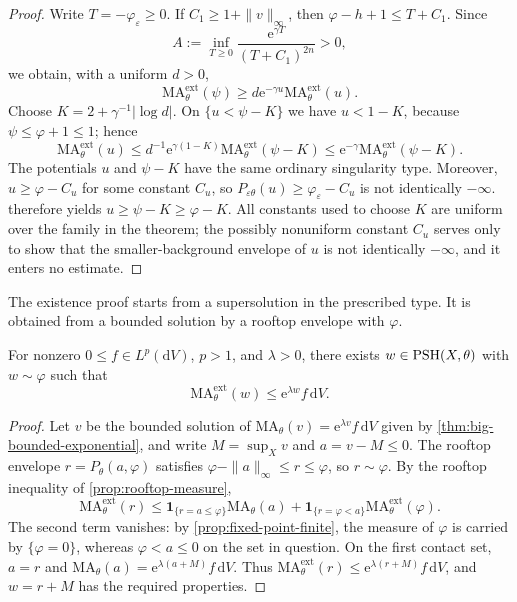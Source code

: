 \begin{proof}
Write $T=-\varphi_\varepsilon\geq0$. If $C_1\geq1+\|v\|_\infty$, then $\varphi-h+1\leq T+C_1$. Since
\[
 A:=\inf_{T\geq0}\frac{\mathrm{e}^{\gamma T}}{(T+C_1)^{2n}}>0,
\]
we obtain, with a uniform $d>0$,
\[
 \mathrm{MA}^{\mathrm{ext}}_\theta(\psi)
 \geq d \mathrm{e}^{-\gamma u}\mathrm{MA}^{\mathrm{ext}}_\theta(u).
\]
Choose $K=2+\gamma^{-1}|\log d|$. On $\{u<\psi-K\}$ we have $u<1-K$, because $\psi\leq\varphi+1\leq1$; hence
\[
 \mathrm{MA}^{\mathrm{ext}}_\theta(u)
 \leq d^{-1}\mathrm{e}^{\gamma(1-K)}
            \mathrm{MA}^{\mathrm{ext}}_\theta(\psi-K)
 \leq \mathrm{e}^{-\gamma}\mathrm{MA}^{\mathrm{ext}}_\theta(\psi-K).
\]
The potentials $u$ and $\psi-K$ have the same ordinary singularity type. Moreover, $u\geq\varphi-C_u$ for some constant $C_u$, so $P_{\varepsilon\theta}(u)\geq\varphi_\varepsilon-C_u$ is not identically $-\infty$.  therefore yields $u\geq\psi-K\geq\varphi-K$. All constants used to choose $K$ are uniform over the family in the theorem; the possibly nonuniform constant $C_u$ serves only to show that the smaller-background envelope of $u$ is not identically $-\infty$, and it enters no estimate.
\end{proof}

The existence proof starts from a supersolution in the prescribed type. It is obtained from a bounded solution by a rooftop envelope with $\varphi$.

\begin{lemma}\label{lem:relative-lp-supersolution}
For nonzero $0\leq f\in L^p(\mathrm{d}V)$, $p>1$, and $\lambda>0$, there exists $w\in\mathrm{PSH}(X,\theta)$ with $w\sim\varphi$ such that
\[
 \mathrm{MA}^{\mathrm{ext}}_\theta(w)\leq \mathrm{e}^{\lambda w}f\,\mathrm{d}V.
\]
\end{lemma}
\begin{proof}
Let $v$ be the bounded solution of $\mathrm{MA}_\theta(v)=\mathrm{e}^{\lambda v}f\,\mathrm{d}V$ given by \cref{thm:big-bounded-exponential}, and write $M=\sup_Xv$ and $a=v-M\leq0$. The rooftop envelope $r=P_\theta(a,\varphi)$ satisfies $\varphi-\|a\|_\infty\leq r\leq\varphi$, so $r\sim\varphi$. By the rooftop inequality of \cref{prop:rooftop-measure},
\[
 \mathrm{MA}^{\mathrm{ext}}_\theta(r)
 \leq\mathbf1_{\{r=a\leq\varphi\}}\mathrm{MA}_\theta(a)
   +\mathbf1_{\{r=\varphi<a\}}\mathrm{MA}^{\mathrm{ext}}_\theta(\varphi).
\]
The second term vanishes: by \cref{prop:fixed-point-finite}, the measure of $\varphi$ is carried by $\{\varphi=0\}$, whereas $\varphi<a\leq0$ on the set in question. On the first contact set, $a=r$ and $\mathrm{MA}_\theta(a)=\mathrm{e}^{\lambda(a+M)}f\,\mathrm{d}V$. Thus $\mathrm{MA}^{\mathrm{ext}}_\theta(r)\leq \mathrm{e}^{\lambda(r+M)}f\,\mathrm{d}V$, and $w=r+M$ has the required properties.
\end{proof}

